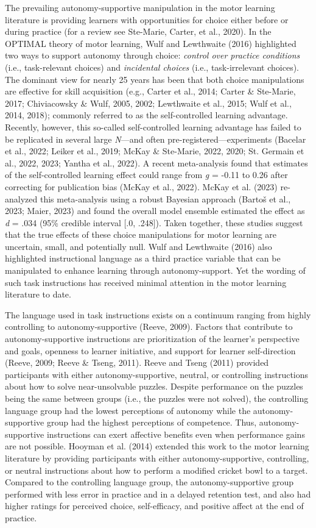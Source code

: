 \documentclass[
  doc, donotrepeattitle,floatsintext]{apa7}
\begin{document}
The prevailing autonomy-supportive manipulation in the motor learning literature is providing learners with opportunities for choice either before or during practice (for a review see Ste-Marie, Carter, et al., 2020). In the OPTIMAL theory of motor learning, Wulf and Lewthwaite (2016) highlighted two ways to support autonomy through choice: \emph{control over practice conditions} (i.e., task-relevant choices) and \emph{incidental choices} (i.e., task-irrelevant choices). The dominant view for nearly 25 years has been that both choice manipulations are effective for skill acquisition (e.g., Carter et al., 2014; Carter \& Ste-Marie, 2017; Chiviacowsky \& Wulf, 2005, 2002; Lewthwaite et al., 2015; Wulf et al., 2014, 2018); commonly referred to as the self-controlled learning advantage. Recently, however, this so-called self-controlled learning advantage has failed to be replicated in several large \emph{N}---and often pre-registered---experiments (Bacelar et al., 2022; Leiker et al., 2019; McKay \& Ste-Marie, 2022, 2020; St. Germain et al., 2022, 2023; Yantha et al., 2022). A recent meta-analysis found that estimates of the self-controlled learning effect could range from \emph{g} = -0.11 to 0.26 after correcting for publication bias (McKay et al., 2022). McKay et al. (2023) re-analyzed this meta-analysis using a robust Bayesian approach (Bartoš et al., 2023; Maier, 2023) and found the overall model ensemble estimated the effect as \emph{d} = .034 (95\% credible interval {[}.0, .248{]}). Taken together, these studies suggest that the true effects of these choice manipulations for motor learning are uncertain, small, and potentially null. Wulf and Lewthwaite (2016) also highlighted instructional language as a third practice variable that can be manipulated to enhance learning through autonomy-support. Yet the wording of such task instructions has received minimal attention in the motor learning literature to date.

The language used in task instructions exists on a continuum ranging from highly controlling to autonomy-supportive (Reeve, 2009). Factors that contribute to autonomy-supportive instructions are prioritization of the learner's perspective and goals, openness to learner initiative, and support for learner self-direction (Reeve, 2009; Reeve \& Tseng, 2011). Reeve and Tseng (2011) provided participants with either autonomy-supportive, neutral, or controlling instructions about how to solve near-unsolvable puzzles. Despite performance on the puzzles being the same between groups (i.e., the puzzles were not solved), the controlling language group had the lowest perceptions of autonomy while the autonomy-supportive group had the highest perceptions of competence. Thus, autonomy-supportive instructions can exert affective benefits even when performance gains are not possible. Hooyman et al. (2014) extended this work to the motor learning literature by providing participants with either autonomy-supportive, controlling, or neutral instructions about how to perform a modified cricket bowl to a target. Compared to the controlling language group, the autonomy-supportive group performed with less error in practice and in a delayed retention test, and also had higher ratings for perceived choice, self-efficacy, and positive affect at the end of practice.
\end{document}
